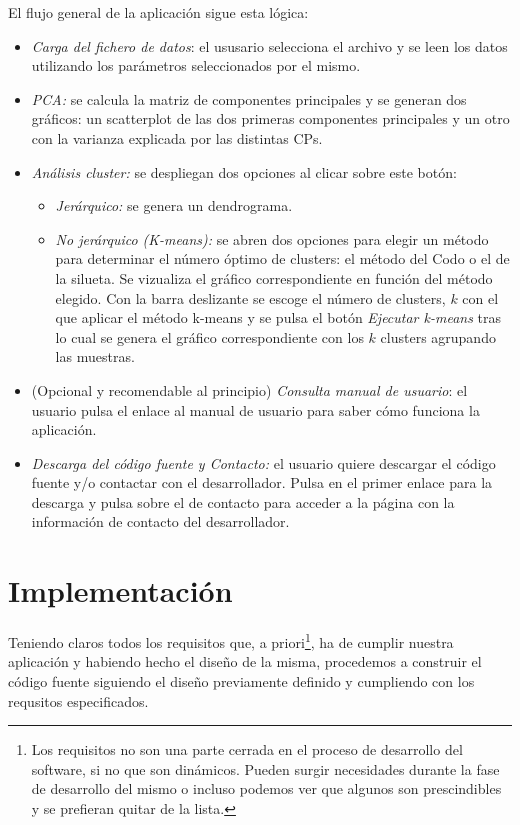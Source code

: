 El flujo general de la aplicación sigue esta lógica:

\begin{itemize}
    \item \textit{Carga del fichero de datos}: el ususario selecciona el archivo y se leen los datos utilizando los parámetros seleccionados por el mismo.
    \item \textit{PCA: } se calcula la matriz de componentes principales y se generan dos gráficos: un scatterplot de las dos primeras componentes principales y 
    un otro con la varianza explicada por las distintas CPs.
    \item \textit{Análisis cluster:} se despliegan dos opciones al clicar sobre este botón:
    \begin{itemize}
        \item \textit{Jerárquico: } se genera un dendrograma.
        \item \textit{No jerárquico (K-means): } se abren dos opciones para elegir un método para determinar el número óptimo de clusters: el método del Codo o el
        de la silueta. Se vizualiza el gráfico correspondiente en función del método elegido.
        Con la barra deslizante se escoge el número de clusters, $k$ con el que aplicar el método k-means y se pulsa el botón \textit{Ejecutar k-means} tras
        lo cual se genera el gráfico correspondiente con los $k$ clusters agrupando las muestras.
    \end{itemize}
    \item (Opcional y recomendable al principio) \textit{Consulta manual de usuario}: el usuario pulsa el enlace al manual de usuario para saber cómo funciona la aplicación.
    \item \textit{Descarga del código fuente y Contacto:} el usuario quiere descargar el código fuente y/o contactar con el desarrollador. Pulsa en el primer enlace para la descarga
    y pulsa sobre el de contacto para acceder a la página con la información de contacto del desarrollador.
\end{itemize}


\section{Implementación}

Teniendo claros todos los requisitos que, a priori\footnote[1]{Los requisitos no son una parte cerrada en el proceso de desarrollo del software, si no que son dinámicos. Pueden surgir necesidades durante
la fase de desarrollo del mismo o incluso podemos ver que algunos son prescindibles y se prefieran quitar de la lista.}, ha de cumplir nuestra aplicación y habiendo hecho el diseño
de la misma, procedemos a construir el código fuente siguiendo el diseño previamente definido y cumpliendo con los requsitos especificados. \newline

